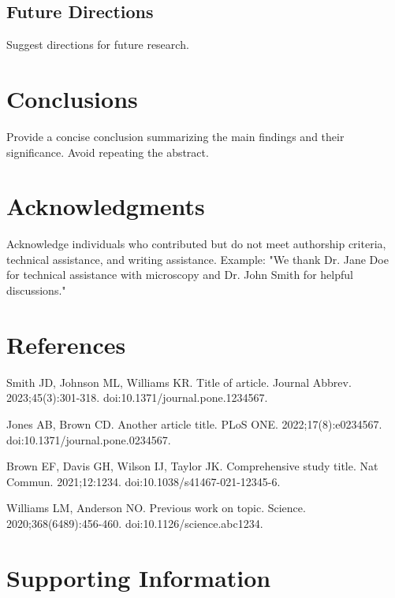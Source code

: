 \documentclass[10pt,letterpaper]{article}
\begin{document}
\subsection*{Future Directions}
Suggest directions for future research.

\section*{Conclusions}

Provide a concise conclusion summarizing the main findings and their significance. Avoid repeating the abstract.

\section*{Acknowledgments}

Acknowledge individuals who contributed but do not meet authorship criteria, technical assistance, and writing assistance. Example: "We thank Dr. Jane Doe for technical assistance with microscopy and Dr. John Smith for helpful discussions."

\section*{References}




\begin{thebibliography}{99}

Smith JD, Johnson ML, Williams KR. Title of article. Journal Abbrev. 2023;45(3):301-318. doi:10.1371/journal.pone.1234567.

Jones AB, Brown CD. Another article title. PLoS ONE. 2022;17(8):e0234567. doi:10.1371/journal.pone.0234567.

Brown EF, Davis GH, Wilson IJ, Taylor JK. Comprehensive study title. Nat Commun. 2021;12:1234. doi:10.1038/s41467-021-12345-6.

Williams LM, Anderson NO. Previous work on topic. Science. 2020;368(6489):456-460. doi:10.1126/science.abc1234.

\end{thebibliography}

\section*{Supporting Information}
\end{document}
